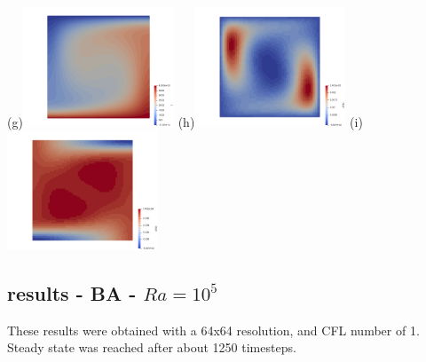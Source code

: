 \begin{center}
(g)\includegraphics[width=4.5cm]{python_codes/fieldstone_compressible2/BA_104/T.png} 
(h)\includegraphics[width=4.5cm]{python_codes/fieldstone_compressible2/BA_104/dTdx.png}
(i)\includegraphics[width=4.5cm]{python_codes/fieldstone_compressible2/BA_104/dTdy.png}  \\
\end{center}

\newpage
\subsection{results - BA - $Ra=10^5$}

These results were obtained with a 64x64 resolution, and CFL number of 1. Steady state was reached 
after about 1250 timesteps.

